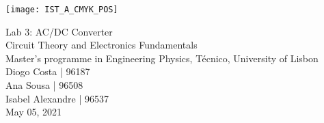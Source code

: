 
\thispagestyle {empty}

\texttt{[image: IST\_A\_CMYK\_POS]}

\begin{center}
%
\vspace{1.0cm}

\vspace{1cm}
{\FontLb \Huge Lab 3: AC/DC Converter} \\ %
\vspace{1cm}
{\FontSn \Large Circuit Theory and Electronics Fundamentals} \\ %
{\FontSn \large Master's programme in Engineering Physics, Técnico, University of Lisbon} \\ %
\vspace{1cm}
{\FontSn Diogo Costa | 96187} \\
{\FontSn Ana Sousa | 96508} \\
{\FontSn Isabel Alexandre | 96537} \\
\vspace{1cm}
{\FontSn May 05, 2021} \\ %
%
\end{center}


